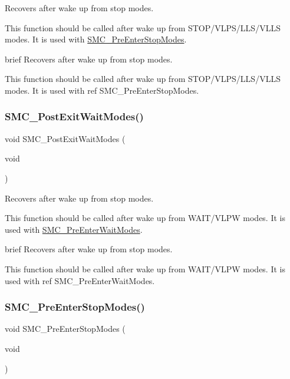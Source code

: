 Recovers after wake up from stop modes. 

This function should be called after wake up from S\+T\+O\+P/\+V\+L\+P\+S/\+L\+L\+S/\+V\+L\+LS modes. It is used with \mbox{\hyperlink{group__smc_ga4e3f84838f007e3b5939838dafd0a7f9}{S\+M\+C\+\_\+\+Pre\+Enter\+Stop\+Modes}}.

brief Recovers after wake up from stop modes.

This function should be called after wake up from S\+T\+O\+P/\+V\+L\+P\+S/\+L\+L\+S/\+V\+L\+LS modes. It is used with ref S\+M\+C\+\_\+\+Pre\+Enter\+Stop\+Modes. \mbox{\label{group__smc_gad91c84fedf08f14580c4c86b52bc52d2}} 
\subsubsection{\texorpdfstring{SMC\_PostExitWaitModes()}{SMC\_PostExitWaitModes()}}
{\footnotesize\ttfamily void S\+M\+C\+\_\+\+Post\+Exit\+Wait\+Modes (\begin{DoxyParamCaption}\item[{void}]{ }\end{DoxyParamCaption})}



Recovers after wake up from stop modes. 

This function should be called after wake up from W\+A\+I\+T/\+V\+L\+PW modes. It is used with \mbox{\hyperlink{group__smc_ga3e21b9caeb6f72076f1ba5fa839c4410}{S\+M\+C\+\_\+\+Pre\+Enter\+Wait\+Modes}}.

brief Recovers after wake up from stop modes.

This function should be called after wake up from W\+A\+I\+T/\+V\+L\+PW modes. It is used with ref S\+M\+C\+\_\+\+Pre\+Enter\+Wait\+Modes. \mbox{\label{group__smc_ga4e3f84838f007e3b5939838dafd0a7f9}} 
\subsubsection{\texorpdfstring{SMC\_PreEnterStopModes()}{SMC\_PreEnterStopModes()}}
{\footnotesize\ttfamily void S\+M\+C\+\_\+\+Pre\+Enter\+Stop\+Modes (\begin{DoxyParamCaption}\item[{void}]{ }\end{DoxyParamCaption})}



